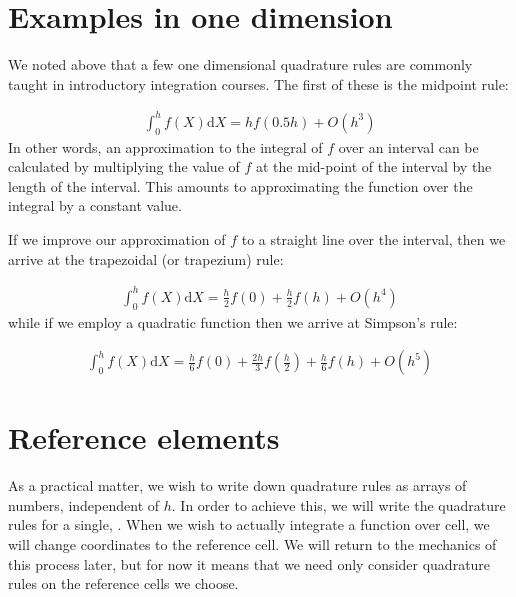 \documentclass{book}
\begin{document}
\section{Examples in one dimension}
\label{\detokenize{1_quadrature:examples-in-one-dimension}}
We noted above that a few one dimensional quadrature rules are commonly
taught in introductory integration courses. The first of these is the
midpoint rule:

\label{\detokenize{1_quadrature:equation-midpoint}}\begin{equation}\label{equation:1_quadrature:midpoint}
\begin{split}\int_0^h f(X) \mathrm{d} X = hf(0.5h) + O(h^3)\end{split}
\end{equation}
In other words, an approximation to the integral of
\(f\) over an interval can be calculated by multiplying the value
of \(f\) at the mid-point of the interval by the length of the
interval. This amounts to approximating the function over the integral
by a constant value.

If we improve our approximation of \(f\) to a straight line over
the interval, then we arrive at the trapezoidal (or trapezium) rule:

\label{\detokenize{1_quadrature:equation-trapezoidal}}\begin{equation}\label{equation:1_quadrature:trapezoidal}
\begin{split}\int_0^h f(X) \mathrm{d} X = \frac{h}{2}f(0) + \frac{h}{2}f(h) + O(h^4)\end{split}
\end{equation}
while if we employ a quadratic function then we arrive at Simpson’s rule:

\label{\detokenize{1_quadrature:equation-1_quadrature:0}}\begin{equation}\label{equation:1_quadrature:1_quadrature:0}
\begin{split}\int_0^h f(X) \mathrm{d} X = \frac{h}{6}f(0) + \frac{2h}{3}f\left(\frac{h}{2}\right) + \frac{h}{6}f(h) + O(h^5)\end{split}
\end{equation}

\section{Reference elements}
\label{\detokenize{1_quadrature:reference-elements}}
As a practical matter, we wish to write down quadrature rules as
arrays of numbers, independent of \(h\). In order to achieve this,
we will write the quadrature rules for a single, . When we wish to actually integrate a function over cell, we
will change coordinates to the reference cell. We will return to the
mechanics of this process later, but for now it means that we need
only consider quadrature rules on the reference cells we choose.
\end{document}
